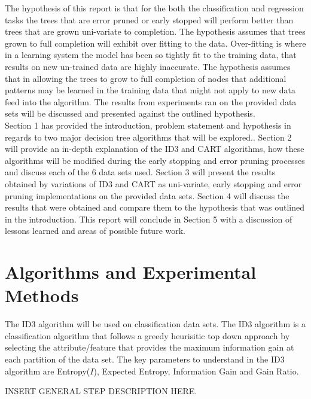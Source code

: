 \documentclass[twoside,11pt]{article}
\begin{document}
\hspace*{5mm} The hypothesis of this report is that for the both the classification and regression tasks the trees that are error pruned or early stopped will perform better than trees that are grown uni-variate to completion. The hypothesis assumes that trees grown to full completion will exhibit over fitting to the data. Over-fitting is where in a learning system the model has been so tightly fit to the training data, that results on new un-trained data are highly inaccurate. The hypothesis assumes that in allowing the trees to grow to full completion of nodes that additional patterns may be learned in the training data that might not apply to new data feed into the algorithm. The results from experiments ran on the provided data sets will be discussed and presented against the outlined hypothesis.\\

\hspace*{5mm} Section 1 has provided the introduction, problem statement and hypothesis in regards to two major decision tree algorithms that will be explored.. Section 2 will provide an in-depth explanation of the ID3 and CART algorithms, how these algorithms will be modified during the early stopping and error pruning processes and discuss each of the 6 data sets used. Section 3 will present the results obtained by variations of ID3 and CART as uni-variate, early stopping and error pruning implementations on the provided data sets. Section 4 will discuss the results that were obtained and compare them to the hypothesis that was outlined in the introduction. This report will conclude in Section 5 with a discussion of lessons learned and areas of possible future work.\\


\section{Algorithms and Experimental Methods}
\hspace*{10mm} The ID3 algorithm will be used on classification data sets. The ID3 algorithm is a classification algorithm that follows a greedy heurisitic top down approach by selecting the attribute/feature that provides the maximum information gain at each partition of the data set. The key parameters to understand in the ID3 algorithm are Entropy($I$), Expected Entropy, Information Gain and Gain Ratio.\newline

INSERT GENERAL STEP DESCRIPTION HERE.\newline
\end{document}
